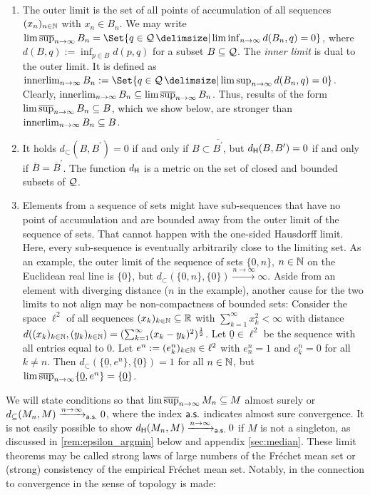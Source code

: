 %
\begin{remark}
\mbox{ }
\begin{enumerate}[label=(\roman*)]
	\item 
		The outer limit is the set of all points of accumulation of all sequences $(x_n)_{n\in\mathbb{N}}$ with $x_n\in B_n$. We may write $\outerlim_{n\to\infty} B_n = \Set{q\in\mc Q \given \liminf_{n\to\infty} d(B_n, q) = 0}$, where $d(B, q) := \inf_{p\in B} d(p, q)$ for a subset $B\subseteq\mathcal{Q}$. The \textit{inner limit} is dual to the outer limit. It is defined as $\innerlim_{n\to\infty} B_n := \Set{q\in\mc Q \given \limsup_{n\to\infty} d(B_n, q) = 0}$. Clearly, $\operatorname*{innerlim}_{n\to\infty} B_n \subseteq \operatorname*{lim\, \overline{sup}}_{n\to\infty} B_n$. Thus, results of the form $\operatorname*{lim\, \overline{sup}}_{n\to\infty} B_n \subseteq B$, which we show below, are stronger than $\operatorname*{innerlim}_{n\to\infty} B_n \subseteq B$.
	\item 
		It holds $d_\subset(B,B^\prime)=0$ if and only if $B \subset \overline{B^\prime}$, but $d_{\mathsf{H}}(B,B^\prime)=0$ if and only if $\overline B = \overline B^ \prime$. The function $d_{\mathsf{H}}$ is a metric on the set of closed and bounded subsets of $\mathcal{Q}$.
	\item 
		Elements from a sequence of sets might have sub-sequences that have no point of accumulation and are bounded away from the outer limit of the sequence of sets. That cannot happen with the one-sided Hausdorff limit. Here, every sub-sequence is eventually arbitrarily close to the limiting set. As an example, the outer limit of the sequence of sets $\{0,n\}$, $n\in\mathbb{N}$ on the Euclidean real line is $\{0\}$, but $d_\subset(\{0,n\},\{0\})\xrightarrow{n\to\infty}\infty$. Aside from an element with diverging distance ($n$ in the example), another cause for the two limits to not align may be non-compactness of bounded sets: Consider the space $\ell^2$ of all sequences $(x_k)_{k\in\mathbb{N}}\subseteq\mathbb{R}$ with $\sum_{k=1}^\infty x_k^2 < \infty$ with distance $d((x_k)_{k\in\mathbb{N}}, (y_k)_{k\in\mathbb{N}}) = (\sum_{k=1}^\infty (x_k-y_k)^2)^\frac12$. Let $\underline{0}\in\ell^2$ be the sequence with all entries equal to 0. Let $e^n := (e^n_k)_{k\in\mathbb{N}}\in\ell^2$ with $e^n_n=1$ and $e^n_k=0$ for all $k\neq n$. Then $d_\subset(\{\underline 0, e^n\}, \{\underline 0\}) = 1$ for all $n\in\mathbb{N}$, but $\operatorname*{lim\, \overline{sup}}_{n\to\infty} \{\underline 0, e^n\} = \{\underline 0\}$.
\end{enumerate}
\end{remark}
%
We will state conditions so that $\operatorname*{lim\, \overline{sup}}_{n\to\infty} M_n \subseteq M$ almost surely or $d_\subseteq(M_n, M) \xrightarrow{n\to\infty}_{\mathsf{a.s.}} 0$, where the index $\mathsf{a.s.}$ indicates almost sure convergence. It is not easily possible to show $d_{\mathsf{H}}(M_n, M) \xrightarrow{n\to\infty}_{\mathsf{a.s.}} 0$ if $M$ is not a singleton, as discussed in \autoref{rem:epsilon_argmin} below and appendix \ref{sec:median}. These limit theorems may be called strong laws of large numbers of the Fréchet mean set or (strong) consistency of the empirical Fréchet mean set. Notably, in \cite{evans20} the connection to convergence in the sense of topology is made:
